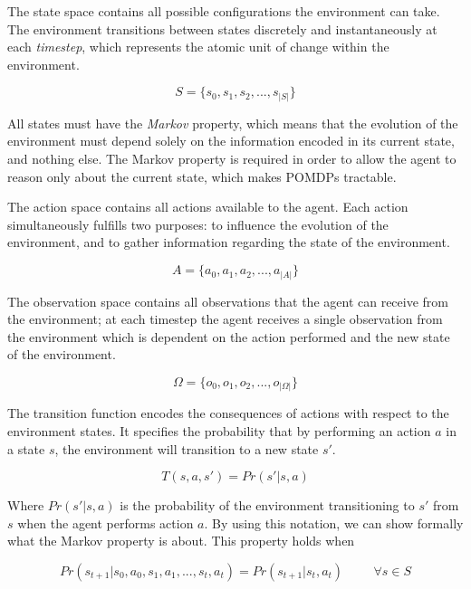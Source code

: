 The state space contains all possible configurations the environment can take.  The environment
transitions between states discretely and instantaneously at each \textit{timestep}, which
represents the atomic unit of change within the environment.

\begin{equation}
 S = \{s_0, s_1, s_2, ..., s_{|S|}\}
\end{equation}

All states must have the \textit{Markov} property, which means that the evolution of the environment
must depend solely on the information encoded in its current state, and nothing else. The Markov
property is required in order to allow the agent to reason only about the current state, which makes
POMDPs tractable.

The action space contains all actions available to the agent. Each action simultaneously fulfills
two purposes: to influence the evolution of the environment, and to gather information regarding the
state of the environment.

\begin{equation}
 A = \{ a_0, a_1, a_2, ..., a_{|A|} \}
\end{equation}

The observation space contains all observations that the agent can receive from the environment; at
each timestep the agent receives a single observation from the environment which is dependent on
the action performed and the new state of the environment.

\begin{equation}
 \Omega = \{ o_0, o_1, o_2, ..., o_{|\Omega|} \}
\end{equation}

The transition function encodes the consequences of actions with respect to the environment states.
It specifies the probability that by performing an action $a$ in a state $s$, the
environment will transition to a new state $s'$.

\begin{equation}
 T(s, a, s') = Pr(s' | s, a)
\end{equation}

Where $Pr(s'|s,a)$ is the probability of the environment transitioning to $s'$ from $s$ when the
agent performs action $a$. By using this notation, we can show formally what the Markov property is
about. This property holds when

\begin{equation}
 Pr(s_{t+1} | s_{0}, a_{0}, s_{1}, a_{1}, ..., s_{t}, a_{t} ) = Pr(s_{t+1} | s_t, a_t ) \hspace{1cm} \forall s \in S
\end{equation}

